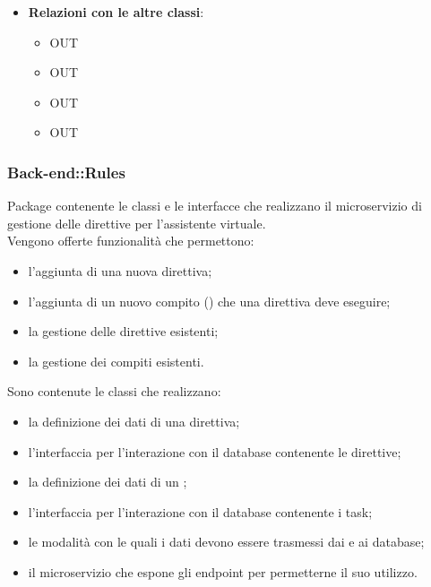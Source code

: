 \begin{itemize}
\begin{itemize}
\begin{itemize}
		\end{itemize}
	\end{itemize}
	\item \textbf{Relazioni con le altre classi}:
	\begin{itemize}
		\item OUT \hyperlink{LambdaContext_label}{}
		\item OUT \hyperlink{LambdaEvent_label}{}
		\item OUT \hyperlink{NotificationChannel_label}{}
		\item OUT \hyperlink{NotificationMessage_label}{}
	\end{itemize}
\end{itemize}
\FloatBarrier
\newpage
\subsubsection{Back-end::Rules}
Package contenente le classi e le interfacce che realizzano il microservizio di gestione delle direttive per l'assistente virtuale.\\
Vengono offerte funzionalità che permettono:
\begin{itemize}
\item l'aggiunta di una nuova direttiva;
\item l'aggiunta di un nuovo compito () che una direttiva deve eseguire;
\item la gestione delle direttive esistenti;
\item la gestione dei compiti esistenti.
\end{itemize}
Sono contenute le classi che realizzano:
\begin{itemize}
\item la definizione dei dati di una direttiva;
\item l'interfaccia per l'interazione con il database contenente le direttive;
\item la definizione dei dati di un ;
\item l'interfaccia per l'interazione con il database contenente i task;
\item le modalità con le quali i dati devono essere trasmessi dai e ai database;
\item il microservizio che espone gli endpoint per permetterne il suo utilizzo.
\end{itemize}
